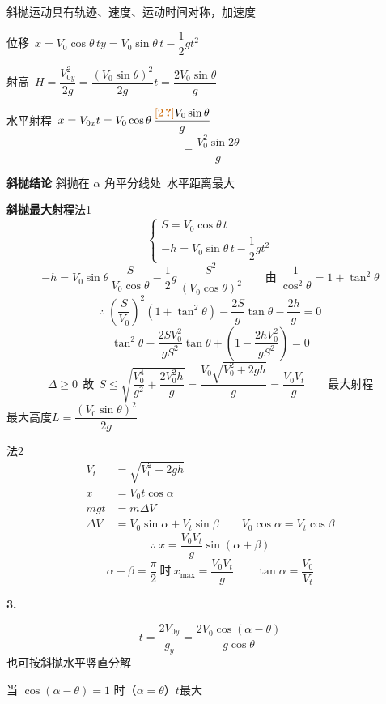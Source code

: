 斜抛运动具有轨迹、速度、运动时间对称，加速度

位移\ $x=V_0\cos\theta\,t$\qquad $y=V_0\sin\theta\,t-\dfrac12gt^2$

射高\ $H=\dfrac{V_{0y}^2}{2g}=\dfrac{(V_0\sin\theta)^2}{2g}$\qquad $t=\dfrac{2V_0\sin\theta}{g}$

水平射程\ $x=V_{0x}t=V_0\cos\theta\,\dfrac{\unclear{2}V_0\sin\theta}{g}$ %
\[
=\frac{V_0^2\sin2\theta}{g}
\]

\textbf{斜抛结论}
斜抛在 $\alpha$ 角平分线处\ 水平距离最大

\noindent \textbf{斜抛最大射程}\qquad 法1
\[ \begin{cases} S=V_0\cos\theta\,t\\ -h=V_0\sin\theta\,t-\dfrac12gt^2\end{cases} \]
\[ -h=V_0\sin\theta\,\frac{S}{V_0\cos\theta}-\frac12g\,\frac{S^2}{(V_0\cos\theta)^2}\qquad\text{由}\ \frac{1}{\cos^2\theta}=1+\tan^2\theta \]
\[ \therefore\ \left(\frac{S}{V_0}\right)^2(1+\tan^2\theta)-\frac{2S}{g}\tan\theta-\frac{2h}{g}=0 \]
\[ \tan^2\theta-\frac{2SV_0^2}{gS^2}\tan\theta+\left(1-\frac{2hV_0^2}{gS^2}\right)=0 \]
\[ \Delta\ge0\ \ \text{故}\ \ S\le\sqrt{\frac{V_0^4}{g^2}+\frac{2V_0^2h}{g}}=\frac{V_0\sqrt{V_0^2+2gh}}{g}=\frac{V_0V_t}{g}\qquad\text{最大射程} \]
\noindent 最大高度\quad $L=\dfrac{(V_0\sin\theta)^2}{2g}$

\noindent 法2
\begin{align*}
V_t&=\sqrt{V_0^2+2gh}\\
x&=V_0t\cos\alpha\\
mgt&=m\Delta V\\
\Delta V&=V_0\sin\alpha+V_t\sin\beta\qquad V_0\cos\alpha=V_t\cos\beta
\end{align*}
\[ \therefore\ x=\frac{V_0V_t}{g}\sin(\alpha+\beta) \]
\[ \alpha+\beta=\frac{\pi}{2}\ \text{时}\ x_{\max}=\frac{V_0V_t}{g}\qquad \tan\alpha=\frac{V_0}{V_t} \]

\textbf{3.}

\[ t=\frac{2V_{0y}}{g_y}=\frac{2V_0\cos(\alpha-\theta)}{g\cos\theta} \]
也可按斜抛水平竖直分解

当 $\cos(\alpha-\theta)=1$ 时（$\alpha=\theta$）$t$最大

